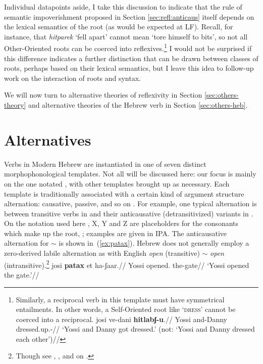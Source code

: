 Individual datapoints aside, I take this discussion to indicate that the rule of semantic impoverishment proposed in Section \ref{sec:refl:anticaus} itself depends on the lexical semantics of the root (as would be expected at LF). Recall, for instance, that \emph{hitparek} `fell apart' cannot mean `tore himself to bits', so not all Other-Oriented roots can be coerced into reflexives.\footnote{
	Similarly, a reciprocal verb in this template must have symmetrical entailments. In other words, a Self-Oriented root like  `\textsc{dress}' cannot be coerced into a reciprocal.
		\ex[exno=i] \begingl
		\gla josi ve-dani \textbf{hitlabʃ-u}.//
		\glb Yossi and-Danny dressed.up.-//
		\glft `Yossi and Danny got dressed.' (not: `Yossi and Danny dressed each other')//
		\endgl
		\xe
	}
I would not be surprised if this difference indicates a further distinction that can be drawn between classes of roots, perhaps based on their lexical semantics, but I leave this idea to follow-up work on the interaction of roots and syntax.

We will now turn to alternative theories of reflexivity in Section \ref{sec:others-theory} and alternative theories of the Hebrew verb in Section \ref{sec:others-heb}.


\section{Alternatives}
Verbs in Modern Hebrew are instantiated in one of seven distinct morphophonological templates. Not all will be discussed here: our focus is mainly on the one notated {\thit}, with other templates brought up as necessary. Each template is traditionally associated with a certain kind of argument structure alternation: causative, passive, and so on \citep{berman78,doron03,arad05,borer13oup,kastner16phd}. For example, one typical alternation is between transitive verbs in {\tkal} and their anticausative (detransitivized) variants in {\tnif}. On the notation used here , X, Y and Z are placeholders for the consonants which make up the root, ; examples are given in IPA. The anticausative alternation for {\tkal}$\sim${\tnif} is shown in~(\ref{ex:patax}). Hebrew does not generally employ a zero-derived labile alternation as with English \emph{open} (transitive) $\sim$ \emph{open} (intransitive).\footnote{Though see \cite{borer91}, \citet[61]{doron03}, \cite{lev15} and \citet[Chapter~2.3.2]{kastner16phd} on {\thif}.} 
\pex\label{ex:patax}
	\a \begingl
		\gla josi \textbf{patax} et ha-ʃaar.//
		\glb Yossi opened.  the-gate//
		\glft `Yossi opened the gate.'//
		\endgl


